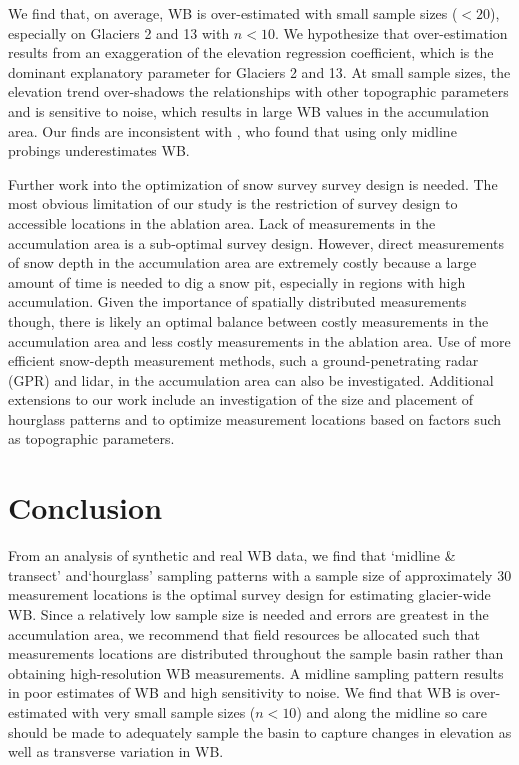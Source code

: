 \documentclass{article}
\begin{document}
We find that, on average, WB is over-estimated with small sample sizes ($<20$), especially on Glaciers 2 and 13 with $n<10$. We hypothesize that over-estimation results from an exaggeration of the elevation regression coefficient, which is the dominant explanatory parameter for Glaciers 2 and 13. At small sample sizes, the elevation trend over-shadows the relationships with other topographic parameters and is sensitive to noise, which results in large WB values in the accumulation area. Our finds are inconsistent with \cite{Walmsley2015}, who found that using only midline probings underestimates WB.

Further work into the optimization of snow survey survey design is needed. The most obvious limitation of our study is the restriction of survey design to accessible locations in the ablation area. Lack of measurements in the accumulation area is a sub-optimal survey design. However, direct measurements of snow depth in the accumulation area are extremely costly because a large amount of time is needed to dig a snow pit, especially in regions with high accumulation. Given the importance of spatially distributed measurements though, there is likely an optimal balance between costly measurements in the accumulation area and less costly measurements in the ablation area. Use of more efficient snow-depth measurement methods, such a ground-penetrating radar (GPR) and lidar, in the accumulation area can also be investigated. Additional extensions to our work include an investigation of the size and placement of hourglass patterns and to optimize measurement locations based on factors such as topographic parameters. 


\section{Conclusion}

From an analysis of synthetic and real WB data, we find that `midline \& transect' and`hourglass' sampling patterns with a sample size of approximately 30 measurement locations is the optimal survey design for estimating glacier-wide WB. Since a relatively low sample size is needed and errors are greatest in the accumulation area, we recommend that field resources be allocated such that measurements locations are distributed throughout the sample basin rather than obtaining high-resolution WB measurements. A midline sampling pattern results in poor estimates of WB and high sensitivity to noise. We find that WB is over-estimated with very small sample sizes ($n<10$) and along the midline so care should be made to adequately sample the basin to capture changes in elevation as well as transverse variation in WB. 
\end{document}

